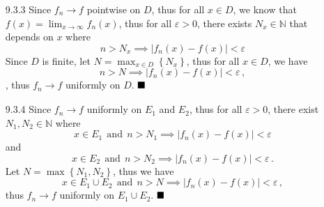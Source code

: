 \documentclass[11pt]{article}
\newcommand{\done}{\ensuremath{
    \strut\hfill\blacksquare
}}
\newcommand{\vertb}[1]{\left\vert#1\right\vert}      %
\newcommand{\braces}[1]{\left\{#1\right\}}           %
\newcommand{\N}{\mathbb{N}}
\newcommand{\e}{\varepsilon}
\newcommand{\lm}[1]{\displaystyle\lim_{#1}}
\begin{document}
\pagestyle{fancy}
\fancyhead{}

\normalsize

\begin{itemize}
    \item [9.3.3] Since $f_n\to f$ pointwise on $D$, thus for all $x\in D$,
    we know that $f(x)=\lm{x\to\infty}f_n(x)$, thus for all $\e>0$, there
    exists $N_x\in\N$ that depends on $x$ where
    \[ n>N_x\implies\vertb{f_n(x)-f(x)}<\e \]
    Since $D$ is finite, let $N=\displaystyle\max_{x\in D}\braces{N_x}$, thus
    for all $x\in D$, we have
    \[ n>N\implies\vertb{f_n(x)-f(x)}<\e \, , \],
    thus $f_n\to f$ uniformly on $D$.
    \done

    \item [9.3.4] Since $f_n\to f$ uniformly on $E_1$ and $E_2$, thus for all
    $\e>0$, there exist $N_1,N_2\in\N$ where
    \[ x\in E_1\ \ \text{and}\ \ n>N_1\implies\vertb{f_n(x)-f(x)}<\e \]
    and
    \[ x\in E_2\ \ \text{and}\ \ n>N_2\implies\vertb{f_n(x)-f(x)}<\e \, . \]
    Let $N=\max\braces{N_1,N_2}$, thus we have
    \[
        x\in E_1\cup E_2\ \ \text{and}\ \ n>N
        \implies\vertb{f_n(x)-f(x)}<\e
        \, ,
    \]
    thus $f_n\to f$ uniformly on $E_1\cup E_2$.
    \done
\end{itemize}
\end{document}

